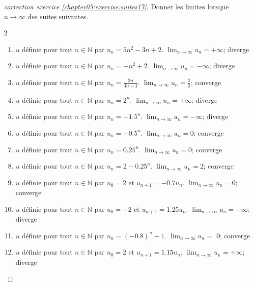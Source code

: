 \documentclass[main.tex]{subfiles}
\begin{document}
\begin{proof}[correction exercice \ref{chapter05:exercise:suites17}] \hfill   Donner les limites lorsque $n\to\infty$ des suites suivantes.
\begin{spacing}{2}
\begin{enumerate}[label=\arabic*),leftmargin=*]
	\item $u$ définie pour tout $n\in\mathbb{N}$ par $u_n=5n^2-3n+2$. $\lim_{n\to\infty}u_n=$\colorbox{BurntOrange}{$+\infty$; diverge} 
	\item $u$ définie pour tout $n\in\mathbb{N}$ par $u_n=-n^2+2$. $\lim_{n\to\infty}u_n=$\colorbox{BurntOrange}{$-\infty$; diverge}  
	\item $u$ définie pour tout $n\in\mathbb{N}$ par $u_n=\frac{2n}{3n+1}$. $\lim_{n\to\infty}u_n=$\colorbox{BurntOrange}{$\frac{2}{3}$; converge} 
	\item $u$ définie pour tout $n\in\mathbb{N}$ par $u_n=2^n$. $\lim_{n\to\infty}u_n=$\colorbox{BurntOrange}{$+\infty$; diverge}  
	\item $u$ définie pour tout $n\in\mathbb{N}$ par $u_n=-1.5^n$. $\lim_{n\to\infty}u_n=$\colorbox{BurntOrange}{$-\infty$; diverge}  
	\item $u$ définie pour tout $n\in\mathbb{N}$ par $u_n=-0.5^n$. $\lim_{n\to\infty}u_n=$\colorbox{BurntOrange}{$0$; converge}  
	\item $u$ définie pour tout $n\in\mathbb{N}$ par $u_n=0.25^n$. $\lim_{n\to\infty}u_n=$\colorbox{BurntOrange}{$0$; converge}  
	\item $u$ définie pour tout $n\in\mathbb{N}$ par $u_n=2-0.25^n$. $\lim_{n\to\infty}u_n=$\colorbox{BurntOrange}{$2$; converge}   
	\item $u$ définie pour tout $n\in\mathbb{N}$ par $u_0=2$ et $u_{n+1}=-0.7u_n$. $\lim_{n\to\infty}u_n=$\colorbox{BurntOrange}{$0$; converge}   
	\item $u$ définie pour tout $n\in\mathbb{N}$ par $u_0=-2$ et $u_{n+1}=1.25u_n$. $\lim_{n\to\infty}u_n=$\colorbox{BurntOrange}{$-\infty$; diverge}   
	\item $u$ définie pour tout $n\in\mathbb{N}$ par $u_n=(-0.8)^n+1$. $\lim_{n\to\infty}u_n=$ \colorbox{BurntOrange}{$0$; converge} 
	\item $u$ définie pour tout $n\in\mathbb{N}$ par $u_0=2$ et $u_{n+1}=1.15u_n$. $\lim_{n\to\infty}u_n=$\colorbox{BurntOrange}{$+\infty$; diverge}   
\end{enumerate} 
\end{spacing}
\end{proof} 
\end{document}
